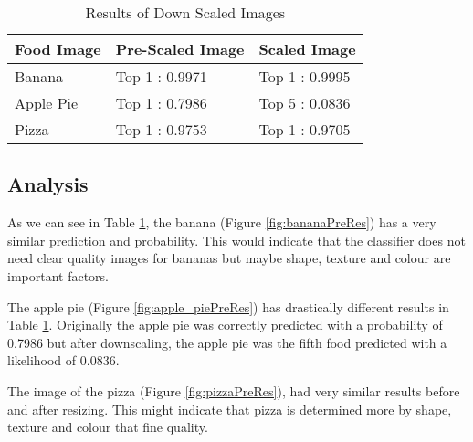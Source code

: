 \begin{table}[]
\centering
\caption{Results of Down Scaled Images}
\label{scaledImages}
\begin{tabular}{|l|l|l|}
\hline
\textbf{Food Image}& \textbf{Pre-Scaled Image} & \textbf{Scaled Image}   \\ \hline
Banana     & Top 1 : 0.9971   & Top 1 : 0.9995 \\ \hline
Apple Pie  & Top 1 : 0.7986   & Top 5 : 0.0836 \\ \hline
Pizza      & Top 1 : 0.9753   & Top 1 : 0.9705 \\ \hline
\end{tabular}
\end{table}

\tocless\subsection{Analysis}
As we can see in Table \ref{scaledImages}, the banana (Figure \ref{fig:bananaPreRes}) has a very similar prediction and probability.
This would indicate that the classifier does not need clear quality images for bananas but maybe shape, texture and colour are important factors.

The apple pie (Figure \ref{fig:apple_piePreRes}) has drastically different results in Table \ref{scaledImages}.
Originally the apple pie was correctly predicted with a probability of 0.7986 but after downscaling, the apple pie was the fifth food predicted with a likelihood of 0.0836.

The image of the pizza (Figure \ref{fig:pizzaPreRes}), had very similar results before and after resizing.
This might indicate that pizza is determined more by shape, texture and colour that fine quality.


